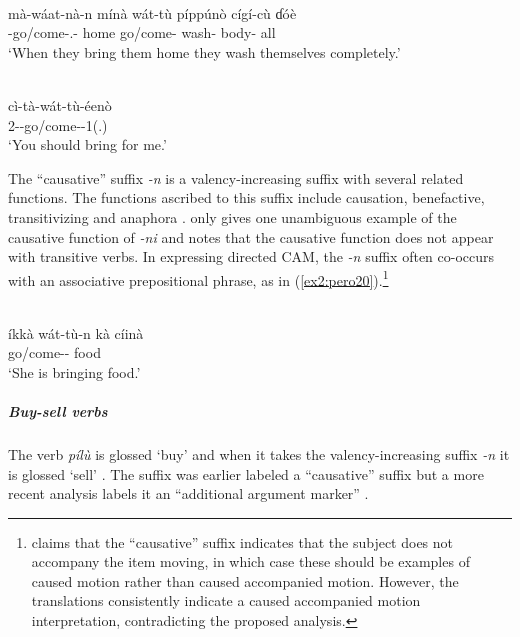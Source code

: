 \ex\label{ex2:pero18}
 \\ 
\gll mà-wáat-nà-n mínà wát-tù píppúnò cígí-cù ɗóè  \\
-go/come-.- home go/come- wash- body- all \\
\glt `When they bring them home they wash themselves completely.'

\ex\label{ex2:pero19}
 \\ 
\gll cì-tà-wát-tù-éenò	\\
2--go/come--1(.)	\\	
\glt `You should bring for me.'
\z 	

\newpage
The ``causative'' suffix \textit{-n} is a valency-increasing suffix with several related functions. The functions ascribed to this suffix include causation, benefactive, transitivizing and anaphora \citep[169--176]{frajzyngierGrammarPero1989}. \citet[173]{frajzyngierGrammarPero1989} only gives one unambiguous example of the causative function of \textit{-ni} and notes that the causative function does not appear with transitive verbs. In expressing directed CAM, the \textit{-n} suffix often co-occurs with an associative prepositional phrase, as in (\ref{ex2:pero20}).\footnote{\citet[174]{frajzyngierGrammarPero1989} claims that the ``causative'' suffix indicates that the subject does not accompany the item moving, in which case these should be examples of caused motion rather than caused accompanied motion. However, the translations consistently indicate a caused accompanied motion interpretation, contradicting the proposed analysis.} 

\ea\label{ex2:pero20}
 \\
\gll íkkà wát-tù-n kà cíinà	\\
 go/come--  food \\		
\glt `She is bringing food.'
\z 

\subparagraph{Buy-sell verbs}



The verb \textit{pílù} is glossed `buy' and when it takes the valency-increasing suffix \textit{-n} it is glossed `sell' \citep[175]{frajzyngierGrammarPero1989}. The suffix was earlier labeled a ``causative'' suffix but a more recent analysis labels it an ``additional argument marker'' \citep[84]{frajzyngierLocativePredicationsChadic2024}.

